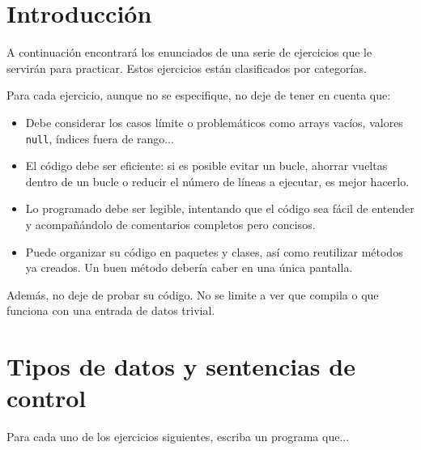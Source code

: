 \documentclass[a4paper]{article}
\newcommand{\code}[1]{\texttt{#1}}
\begin{document}


\section{Introducción}

A continuación encontrará los enunciados de una serie de ejercicios que le servirán para practicar. Estos ejercicios están clasificados por categorías.

Para cada ejercicio, aunque no se especifique, no deje de tener en cuenta que:

\begin{itemize}
    \item Debe considerar los casos límite o problemáticos como arrays vacíos, valores \code{null}, índices fuera de rango...
    \item El código debe ser eficiente: si es posible evitar un bucle, ahorrar vueltas dentro de un bucle o reducir el número de líneas a ejecutar, es mejor hacerlo.
    \item Lo programado debe ser legible, intentando que el código sea fácil de entender y acompañándolo de comentarios completos pero concisos.
    \item Puede organizar su código en paquetes y clases, así como reutilizar métodos ya creados. Un buen método debería caber en una única pantalla.
\end{itemize}

Además, no deje de probar su código. No se limite a ver que compila o que funciona con una entrada de datos trivial.

\section{Tipos de datos y sentencias de control}

Para cada uno de los ejercicios siguientes, escriba un programa que...
\end{document}
